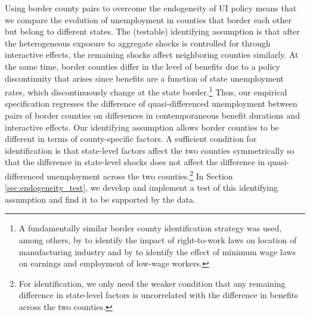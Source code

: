 \documentclass[12pt]{article}
\newcommand{\1}{\mathbf{1}}
\begin{document}
Using border county pairs to overcome the endogeneity of UI policy means that we compare the evolution of unemployment in counties that border each other but belong to different states. The (testable) identifying assumption is that after the heterogeneous exposure to aggregate shocks is controlled for through interactive effects, the remaining shocks affect neighboring counties similarly. At the same time, border counties differ in the level of benefits due to a policy discontinuity that arises since benefits are a function of state unemployment rates, which discontinuously change at the state border.\footnote{A fundamentally similar border county identification strategy was used, among others, by \citet{holmes:98} to identify the impact of right-to-work laws on location of manufacturing industry and by \citet{dube+etal:10} to identify the effect of minimum wage laws on earnings and employment of low-wage workers.} Thus, our empirical specification regresses the difference of quasi-differenced unemployment between pairs of border counties on differences in contemporaneous benefit durations and interactive effects. Our identifying assumption allows border counties to be different in terms of county-specific factors. A sufficient condition for identification is that state-level factors affect the two counties symmetrically so that the difference in state-level shocks does not affect the difference in quasi-differenced unemployment across the two counties.\footnote{For identification, we only need the weaker condition that any remaining difference in state-level factors is uncorrelated with the difference in benefits across the two counties.} In Section \ref{sec:endogeneity_test}, we develop and implement a test of this identifying assumption and find it to be supported by the data.
\end{document}
